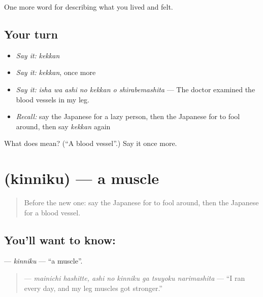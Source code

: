 \begin{grammarlens}[title={What you've built}]
One more word for describing what you lived and felt.
\end{grammarlens}

\subsection*{Your turn}
\begin{itemize}
\raggedright
  \item \emph{Say it:} \emph{kekkan}
  \item \emph{Say it:} \emph{kekkan}, once more
  \item \emph{Say it:} \emph{isha wa ashi no kekkan o shirabemashita} — The doctor examined the blood vessels in my leg.
  \item \emph{Recall:} say the Japanese for a lazy person, then the Japanese for to fool around, then say \emph{kekkan} again
\end{itemize}

\begin{tcolorbox}[breakable,colback=teal!4,colframe=teal!35!black,title={Before you move on}]
What does  mean? (\textquotedblleft{}A blood vessel\textquotedblright{}.) Say it once more.
\end{tcolorbox}
\section[\texorpdfstring{\ja{きんにく} (kinniku)}{きんにく (kinniku)}]{ (kinniku) — a muscle}

\label{lesson:JA-C442-kinniku}



\begin{quote}
Before the new one: say the Japanese for to fool around, then the Japanese for a blood vessel.
\end{quote}

\subsection*{You'll want to know: }
\textbf{} — \emph{kinniku} — \textquotedblleft{}a muscle\textquotedblright{}.

\begin{quote}
\textbf{    } — \emph{mainichi hashitte, ashi no kinniku ga tsuyoku narimashita} — \textquotedblleft{}I ran every day, and my leg muscles got stronger.\textquotedblright{}
\end{quote}

